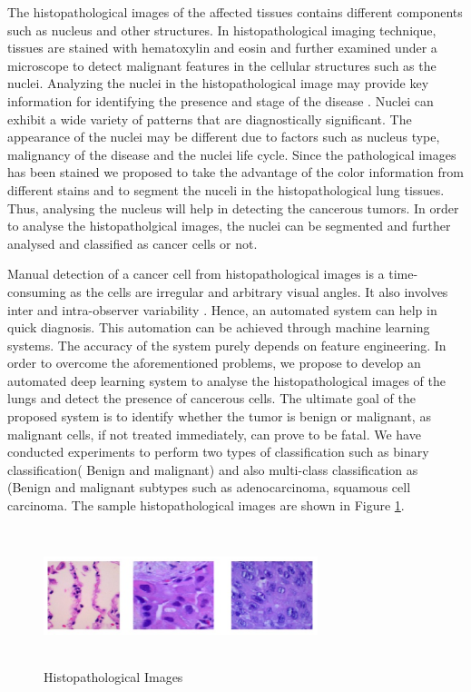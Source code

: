 \documentclass[conference]{IEEEtran}
\begin{document}
The histopathological images of the affected tissues contains different components such as nucleus and other structures.  In histopathological imaging technique, tissues are stained with hematoxylin and eosin and further examined under a microscope to detect malignant features in the cellular structures such as the nuclei. Analyzing the nuclei in the histopathological image may provide key information for identifying the presence and stage of the disease \cite{confjung}. Nuclei can exhibit a wide variety of patterns that are diagnostically significant. The appearance of the nuclei may be different due to factors such as nucleus type, malignancy of the disease and the nuclei life cycle.  Since the pathological images has been stained we proposed to take the advantage of the color information from different stains and to segment the nuceli in the histopathological lung tissues. Thus, analysing the nucleus will help in detecting the cancerous tumors. In order to analyse the histopatholgical images, the nuclei can be segmented and further analysed and classified as cancer cells or not.

Manual detection of a cancer cell from histopathological images is a time-consuming as the cells are irregular and arbitrary visual angles. It also involves inter and intra-observer variability \cite{sumaiya}. Hence, an automated system can help in quick diagnosis. This automation can be achieved through machine learning systems. The accuracy of the system purely depends on feature engineering. In order to overcome the aforementioned problems, we propose to develop an automated deep learning system to analyse the histopathological images of the lungs and detect the presence of cancerous cells. The ultimate goal of the proposed system is to identify whether the tumor is benign or malignant, as malignant cells, if not treated immediately, can prove to be fatal. We have conducted experiments to perform two types of classification such as binary classification( Benign  and malignant) and also multi-class classification as (Benign  and malignant subtypes such as adenocarcinoma, squamous cell carcinoma. The sample histopathological images are shown in Figure \ref{histo_img}.


\begin{figure}[htbp]
\centerline{\includegraphics[width=8cm, height=4cm]{./figures/histo_img.png}}
\caption{Histopathological Images}
\label{histo_img}
\end{figure}
\end{document}
